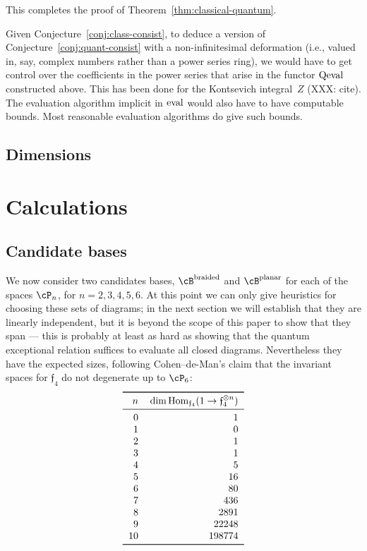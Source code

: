 \documentclass[12pt]{amsart}
\begin{document}
This completes the proof of Theorem~\ref{thm:classical-quantum}.

\begin{remark}
  Given Conjecture~\ref{conj:class-consist}, to deduce a version of
  Conjecture~\ref{conj:quant-consist} with a non-infinitesimal
  deformation (i.e., valued in, say, complex numbers rather than a
  power series ring), we would have to get control over the
  coefficients in the power series that arise in the functor $\operatorname{Qeval}$
  constructed above. This has been done for the Kontsevich
  integral~$Z$ (XXX: cite). The evaluation algorithm implicit in
  $\operatorname{eval}$ would also have to have computable bounds.  Most
  reasonable evaluation algorithms do give such bounds.
\end{remark}



\subsection{Dimensions}

\section{Calculations}
\label{sec:calculations}
\newcommand{\V}{\mathcal{P}}

\subsection{Candidate bases}
\label{sec:bases}
We now consider two candidates bases, $\cB^{\text{braided}}$ and $\cB^{\text
{planar}}$ for each of the spaces $\cP_n$, for $n = 2,3,4,5,6$.
At this point we can only give heuristics for choosing these sets of diagrams;
in the next section we will establish that they are linearly independent, but
it is beyond the scope of this paper to show that they span --- this is
probably at least as hard as showing that the quantum exceptional relation
suffices to evaluate all closed diagrams. Nevertheless they have the expected
sizes, following Cohen--de-Man's claim that the invariant spaces for
$\mathfrak{f}_4$ do not degenerate up to $\cP_6$:
\[
\begin{tabular}{rr}
  \toprule
  $n$ & $\dim \Hom_{\mathfrak{f}_4} (1 \to \mathfrak{f}_4^{\otimes n})$ \\
  \midrule
  0 & 1 \\ 1 & 0 \\ 2 & 1 \\ 3 & 1 \\ 4 & 5 \\ 5 & 16 \\
  6 & 80 \\ 7 & 436 \\ 8 & 2891 \\ 9 & 22248 \\ 10 & 198774 \\
  \bottomrule
\end{tabular}
\]
\end{document}

